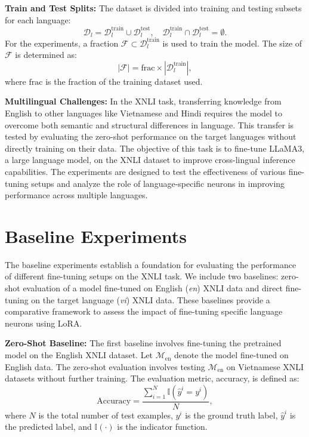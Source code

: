 \textbf{Train and Test Splits:} The dataset is divided into training and testing subsets for each language:
\begin{equation}
	\mathcal{D}_l = \mathcal{D}_l^\text{train} \cup \mathcal{D}_l^\text{test}, \quad \mathcal{D}_l^\text{train} \cap \mathcal{D}_l^\text{test} = \emptyset.
\end{equation}
For the experiments, a fraction \(\mathcal{F} \subset \mathcal{D}_l^\text{train}\) is used to train the model. The size of \(\mathcal{F}\) is determined as:
\begin{equation}
	|\mathcal{F}| = \text{frac} \times |\mathcal{D}_l^\text{train}|,
\end{equation}
where \(\text{frac}\) is the fraction of the training dataset used.

\textbf{Multilingual Challenges:} In the XNLI task, transferring knowledge from English to other languages like Vietnamese and Hindi requires the model to overcome both semantic and structural differences in language. This transfer is tested by evaluating the zero-shot performance on the target languages without directly training on their data. The objective of this task is to fine-tune LLaMA3, a large language model, on the XNLI dataset to improve cross-lingual inference capabilities. The experiments are designed to test the effectiveness of various fine-tuning setups and analyze the role of language-specific neurons in improving performance across multiple languages.

\section{Baseline Experiments}

The baseline experiments establish a foundation for evaluating the performance of different fine-tuning setups on the XNLI task. We include two baselines: zero-shot evaluation of a model fine-tuned on English (\textit{en}) XNLI data and direct fine-tuning on the target language (\textit{vi}) XNLI data. These baselines provide a comparative framework to assess the impact of fine-tuning specific language neurons using LoRA.

\textbf{Zero-Shot Baseline:} The first baseline involves fine-tuning the pretrained model on the English XNLI dataset. Let \(\mathcal{M}_\text{en}\) denote the model fine-tuned on English data. The zero-shot evaluation involves testing \(\mathcal{M}_\text{en}\) on Vietnamese XNLI datasets without further training. The evaluation metric, accuracy, is defined as:
\begin{equation}
	\text{Accuracy} = \frac{\sum_{i=1}^N \mathbb{I}(\hat{y}^i = y^i)}{N},
\end{equation}
where \(N\) is the total number of test examples, \(y^i\) is the ground truth label, \(\hat{y}^i\) is the predicted label, and \(\mathbb{I}(\cdot)\) is the indicator function.

